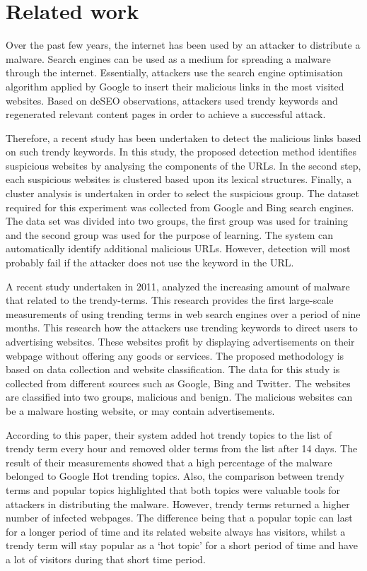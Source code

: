 \section{Related work}

Over the past few years, the internet has been used by an attacker to distribute a malware. Search engines can be used as a medium for spreading a malware through the internet. Essentially, attackers use the search engine optimisation algorithm applied by Google to insert their malicious links in the most visited websites. Based on deSEO observations, attackers used trendy keywords and regenerated relevant content pages in order to achieve a successful attack\cite{deSEO}.

Therefore, a recent study has been undertaken to detect the malicious links based on such trendy keywords. In this study, the proposed detection method identifies suspicious websites by analysing the components of the URLs. In the second step, each suspicious websites is clustered based upon its lexical structures. Finally, a cluster analysis is undertaken in order to select the suspicious group\cite{deSEO}.
The dataset required for this experiment was collected from Google and Bing search engines. The data set was divided into two groups, the first group was used for training and the second group was used for the purpose of learning. The system can automatically identify additional malicious URLs. However, detection will most probably fail if the attacker does not use the keyword in the URL\cite{deSEO}.

A recent study undertaken in 2011, analyzed the increasing amount of malware that related to the trendy-terms. This research provides the first large-scale measurements of using trending terms in web search engines over a period of nine months. This research how the attackers use trending keywords to direct users to advertising websites. These websites profit by displaying advertisements on their webpage without offering any goods or services\cite{moore2011fashion}.
The proposed methodology is based on data collection and website classification. The data for this study is collected from different sources such as Google, Bing and Twitter. The websites are classified into two groups, malicious and benign. The malicious websites can be a malware hosting website, or may contain advertisements\cite{moore2011fashion}.

According to this paper, their system added hot trendy topics to the list of trendy term every hour and removed older terms from the list after 14 days. The result of their measurements showed that a high percentage of the malware belonged to Google Hot trending topics. Also, the comparison between trendy terms and popular topics highlighted that both topics were valuable tools for attackers in distributing the malware. However, trendy terms returned a higher number of infected webpages. The difference being that a popular topic can last for a longer period of time and its related website always has visitors, whilst a trendy term will stay popular as a ‘hot topic’ for a short period of time and have a lot of visitors during that short time period\cite{moore2011fashion}.